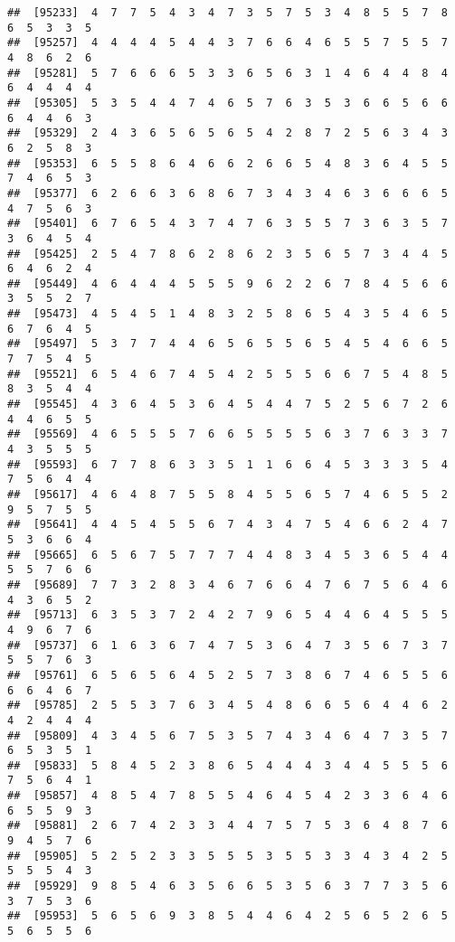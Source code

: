 \documentclass[
]{book}
\begin{document}
\begin{verbatim}
##  [95233]  4  7  7  5  4  3  4  7  3  5  7  5  3  4  8  5  5  7  8  6  5  3  3  5
##  [95257]  4  4  4  4  5  4  4  3  7  6  6  4  6  5  5  7  5  5  7  4  8  6  2  6
##  [95281]  5  7  6  6  6  5  3  3  6  5  6  3  1  4  6  4  4  8  4  6  4  4  4  4
##  [95305]  5  3  5  4  4  7  4  6  5  7  6  3  5  3  6  6  5  6  6  6  4  4  6  3
##  [95329]  2  4  3  6  5  6  5  6  5  4  2  8  7  2  5  6  3  4  3  6  2  5  8  3
##  [95353]  6  5  5  8  6  4  6  6  2  6  6  5  4  8  3  6  4  5  5  7  4  6  5  3
##  [95377]  6  2  6  6  3  6  8  6  7  3  4  3  4  6  3  6  6  6  5  4  7  5  6  3
##  [95401]  6  7  6  5  4  3  7  4  7  6  3  5  5  7  3  6  3  5  7  3  6  4  5  4
##  [95425]  2  5  4  7  8  6  2  8  6  2  3  5  6  5  7  3  4  4  5  6  4  6  2  4
##  [95449]  4  6  4  4  4  5  5  5  9  6  2  2  6  7  8  4  5  6  6  3  5  5  2  7
##  [95473]  4  5  4  5  1  4  8  3  2  5  8  6  5  4  3  5  4  6  5  6  7  6  4  5
##  [95497]  5  3  7  7  4  4  6  5  6  5  5  6  5  4  5  4  6  6  5  7  7  5  4  5
##  [95521]  6  5  4  6  7  4  5  4  2  5  5  5  6  6  7  5  4  8  5  8  3  5  4  4
##  [95545]  4  3  6  4  5  3  6  4  5  4  4  7  5  2  5  6  7  2  6  4  4  6  5  5
##  [95569]  4  6  5  5  5  7  6  6  5  5  5  5  6  3  7  6  3  3  7  4  3  5  5  5
##  [95593]  6  7  7  8  6  3  3  5  1  1  6  6  4  5  3  3  3  5  4  7  5  6  4  4
##  [95617]  4  6  4  8  7  5  5  8  4  5  5  6  5  7  4  6  5  5  2  9  5  7  5  5
##  [95641]  4  4  5  4  5  5  6  7  4  3  4  7  5  4  6  6  2  4  7  5  3  6  6  4
##  [95665]  6  5  6  7  5  7  7  7  4  4  8  3  4  5  3  6  5  4  4  5  5  7  6  6
##  [95689]  7  7  3  2  8  3  4  6  7  6  6  4  7  6  7  5  6  4  6  4  3  6  5  2
##  [95713]  6  3  5  3  7  2  4  2  7  9  6  5  4  4  6  4  5  5  5  4  9  6  7  6
##  [95737]  6  1  6  3  6  7  4  7  5  3  6  4  7  3  5  6  7  3  7  5  5  7  6  3
##  [95761]  6  5  6  5  6  4  5  2  5  7  3  8  6  7  4  6  5  5  6  6  6  4  6  7
##  [95785]  2  5  5  3  7  6  3  4  5  4  8  6  6  5  6  4  4  6  2  4  2  4  4  4
##  [95809]  4  3  4  5  6  7  5  3  5  7  4  3  4  6  4  7  3  5  7  6  5  3  5  1
##  [95833]  5  8  4  5  2  3  8  6  5  4  4  4  3  4  4  5  5  5  6  7  5  6  4  1
##  [95857]  4  8  5  4  7  8  5  5  4  6  4  5  4  2  3  3  6  4  6  6  5  5  9  3
##  [95881]  2  6  7  4  2  3  3  4  4  7  5  7  5  3  6  4  8  7  6  9  4  5  7  6
##  [95905]  5  2  5  2  3  3  5  5  5  3  5  5  3  3  4  3  4  2  5  5  5  5  4  3
##  [95929]  9  8  5  4  6  3  5  6  6  5  3  5  6  3  7  7  3  5  6  3  7  5  3  6
##  [95953]  5  6  5  6  9  3  8  5  4  4  6  4  2  5  6  5  2  6  5  5  6  5  5  6

\end{verbatim}
\end{document}
